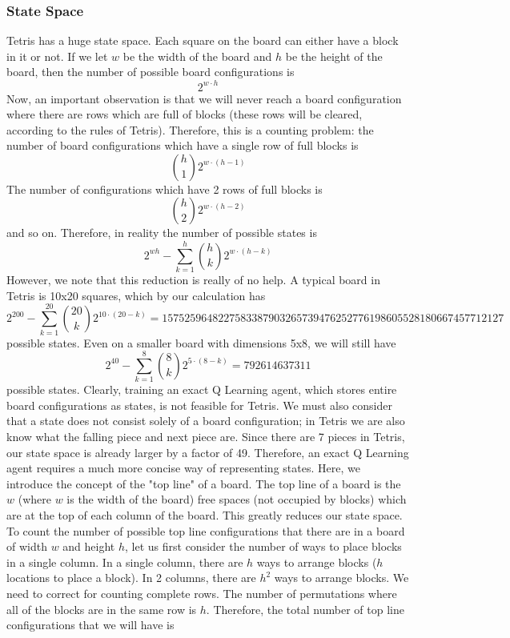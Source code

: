 \documentclass[10pt]{article}
\begin{document}
\subsubsection{State Space}
Tetris has a huge state space. Each square on the board can either have a block in it or not. If we let $w$ be the width of the board and $h$ be the height of the board, then the number of possible board configurations is $$2^{w\cdot h}$$
Now, an important observation is that we will never reach a board configuration where there are rows which are full of blocks (these rows will be cleared, according to the rules of Tetris). Therefore, this is a counting problem: the number of board configurations which have a single row of full blocks is
$$\binom{h}{1}2^{w\cdot(h-1)}$$
The number of configurations which have 2 rows of full blocks is
$$\binom{h}{2}2^{w\cdot(h-2)}$$
and so on. Therefore, in reality the number of possible states is
$$2^{wh} - \sum_{k=1}^{h}\binom{h}{k}2^{w\cdot(h-k)}$$
However, we note that this reduction is really of no help. A typical board in Tetris is 10x20 squares, which by our calculation has
$$2^{200} - \sum_{k=1}^{20}\binom{20}{k}2^{10\cdot(20-k)}=1575259648227583387903265739476252776198605528180667457712127$$
possible states. Even on a smaller board with dimensions 5x8, we will still have
$$2^{40} - \sum_{k=1}^{8}\binom{8}{k}2^{5\cdot(8-k)}=792614637311$$
possible states. Clearly, training an exact Q Learning agent, which stores entire board configurations as states, is not feasible for Tetris. We must also consider that a state does not consist solely of a board configuration; in Tetris we are also know what the falling piece and next piece are. Since there are 7 pieces in Tetris, our state space is already larger by a factor of 49. Therefore, an exact Q Learning agent requires a much more concise way of representing states. Here, we introduce the concept of the "top line" of a board. The top line of a board is the $w$ (where $w$ is the width of the board) free spaces (not occupied by blocks) which are at the top of each column of the board. This greatly reduces our state space. To count the number of possible top line configurations that there are in a board of width $w$ and height $h$, let us first consider the number of ways to place blocks in a single column. In a single column, there are $h$ ways to arrange blocks ($h$ locations to place a block). In 2 columns, there are $h^2$ ways to arrange blocks. We need to correct for counting complete rows. The number of permutations where all of the blocks are in the same row is $h$. Therefore, the total number of top line configurations that we will have is
\end{document}
